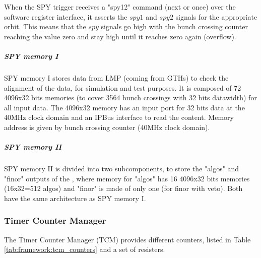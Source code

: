 

When the SPY trigger receives a "spy12" command (next or once) over the software register interface, it asserts the $spy1$ and $spy2$ signals for the appropriate orbit.
This means that the $spy$ signals go high with the bunch crossing counter reaching the value zero and stay high until it reaches zero again (overflow).

\subparagraph{SPY memory I}
SPY memory I stores data from LMP (coming from GTHs) to check the alignment of the data, for simulation and test purposes. It is composed of 72 4096x32 bits memories (to cover 3564 bunch crossings with 32 bits datawidth) for all input data. The 4096x32 memory has an input port for 32 bits data at the 40MHz clock domain and an IPBus interface to read the content. Memory address is given by bunch crossing counter (40MHz clock domain).

\subparagraph{SPY memory II}
SPY memory II is divided into two subcomponents, to store the "algos" and "finor" outputs of the \ufdl, where memory for "algos" has 16 4096x32 bits memories (16x32=512 algos) and "finor" is made of only one (for finor with veto). Both have the same architecture as SPY memory I.

%
%
\subsubsection{Timer Counter Manager}\label{sec:framework:tcm}

The Timer Counter Manager (TCM) provides different counters, listed in Table \ref{tab:framework:tcm_counters} and a set of resisters.

